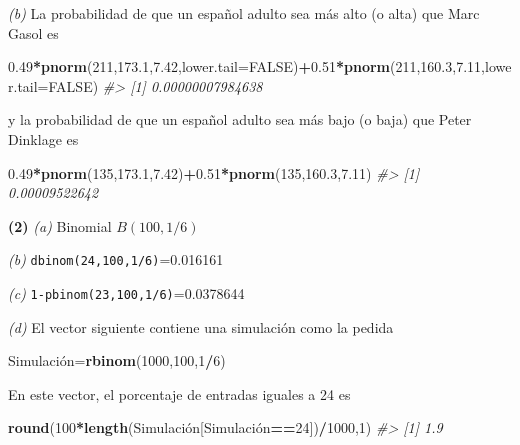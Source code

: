 \documentclass[
]{book}
\newenvironment{Shaded}{\begin{snugshade}}{\end{snugshade}}
\newcommand{\CommentTok}[1]{\textcolor[rgb]{0.56,0.35,0.01}{\textit{#1}}}
\newcommand{\DataTypeTok}[1]{\textcolor[rgb]{0.13,0.29,0.53}{#1}}
\newcommand{\DecValTok}[1]{\textcolor[rgb]{0.00,0.00,0.81}{#1}}
\newcommand{\FloatTok}[1]{\textcolor[rgb]{0.00,0.00,0.81}{#1}}
\newcommand{\KeywordTok}[1]{\textcolor[rgb]{0.13,0.29,0.53}{\textbf{#1}}}
\newcommand{\NormalTok}[1]{#1}
\newcommand{\OperatorTok}[1]{\textcolor[rgb]{0.81,0.36,0.00}{\textbf{#1}}}
\newcommand{\OtherTok}[1]{\textcolor[rgb]{0.56,0.35,0.01}{#1}}
\theoremstyle{definition}
\theoremstyle{definition}
\theoremstyle{definition}
\theoremstyle{remark}
\begin{document}
\emph{(b)} La probabilidad de que un español adulto sea más alto (o alta) que Marc Gasol es

\begin{Shaded}
\begin{Highlighting}[]
\FloatTok{0.49}\OperatorTok{*}\KeywordTok{pnorm}\NormalTok{(}\DecValTok{211}\NormalTok{,}\FloatTok{173.1}\NormalTok{,}\FloatTok{7.42}\NormalTok{,}\DataTypeTok{lower.tail=}\OtherTok{FALSE}\NormalTok{)}\OperatorTok{+}\FloatTok{0.51}\OperatorTok{*}\KeywordTok{pnorm}\NormalTok{(}\DecValTok{211}\NormalTok{,}\FloatTok{160.3}\NormalTok{,}\FloatTok{7.11}\NormalTok{,}\DataTypeTok{lower.tail=}\OtherTok{FALSE}\NormalTok{)}
\CommentTok{\#\textgreater{} [1] 0.00000007984638}
\end{Highlighting}
\end{Shaded}

y la probabilidad de que un español adulto sea más bajo (o baja) que Peter Dinklage es

\begin{Shaded}
\begin{Highlighting}[]
\FloatTok{0.49}\OperatorTok{*}\KeywordTok{pnorm}\NormalTok{(}\DecValTok{135}\NormalTok{,}\FloatTok{173.1}\NormalTok{,}\FloatTok{7.42}\NormalTok{)}\OperatorTok{+}\FloatTok{0.51}\OperatorTok{*}\KeywordTok{pnorm}\NormalTok{(}\DecValTok{135}\NormalTok{,}\FloatTok{160.3}\NormalTok{,}\FloatTok{7.11}\NormalTok{)}
\CommentTok{\#\textgreater{} [1] 0.00009522642}
\end{Highlighting}
\end{Shaded}

\textbf{(2)} \emph{(a)} Binomial \(B(100,1/6)\)

\emph{(b)} \texttt{dbinom(24,100,1/6)}=0.016161

\emph{(c)} \texttt{1-pbinom(23,100,1/6)}=0.0378644

\emph{(d)} El vector siguiente contiene una simulación como la pedida

\begin{Shaded}
\begin{Highlighting}[]
\NormalTok{Simulación=}\KeywordTok{rbinom}\NormalTok{(}\DecValTok{1000}\NormalTok{,}\DecValTok{100}\NormalTok{,}\DecValTok{1}\OperatorTok{/}\DecValTok{6}\NormalTok{)}
\end{Highlighting}
\end{Shaded}

En este vector, el porcentaje de entradas iguales a 24 es

\begin{Shaded}
\begin{Highlighting}[]
\KeywordTok{round}\NormalTok{(}\DecValTok{100}\OperatorTok{*}\KeywordTok{length}\NormalTok{(Simulación[Simulación}\OperatorTok{==}\DecValTok{24}\NormalTok{])}\OperatorTok{/}\DecValTok{1000}\NormalTok{,}\DecValTok{1}\NormalTok{)}
\CommentTok{\#\textgreater{} [1] 1.9}
\end{Highlighting}
\end{Shaded}
\end{document}

